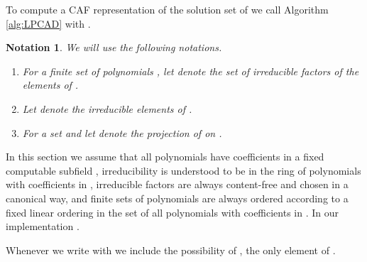 \documentclass[english]{amsart}
\numberwithin{equation}{section}
\numberwithin{figure}{section}
\newtheorem{notation}[thm]{Notation}
\begin{document}
To compute a CAF representation of the solution set of  we call
Algorithm \ref{alg:LPCAD} with .
\begin{notation}
We will use the following notations.
\begin{enumerate}
\item For a finite set of polynomials , let  denote the
set of irreducible factors of the elements of . 
\item Let  denote the irreducible elements of .
\item For a set  and  let 
denote the projection of  on .
\end{enumerate}
\end{notation}
In this section we assume that all polynomials have coefficients in
a fixed computable subfield , irreducibility
is understood to be in the ring of polynomials with coefficients in
, irreducible factors are always content-free and chosen in a
canonical way, and finite sets of polynomials are always ordered according
to a fixed linear ordering in the set of all polynomials with coefficients
in . In our implementation .

Whenever we write \emph{}
with  we include the possibility of , the only element
of . 
\end{document}
